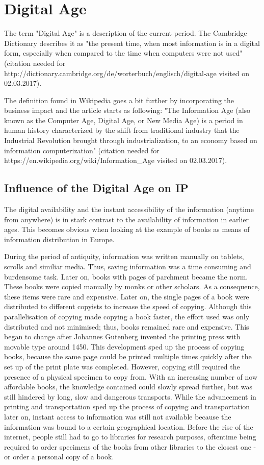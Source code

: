 \documentclass[a4paper]{report}
\begin{document}
\section{Digital Age}
\label{sec:Digital age}
The term "Digital Age" is a description of the current period. The Cambridge Dictionary describes it as "the present time, when most information is in a digital form, especially when compared to the time when computers were not used" (citation needed for http://dictionary.cambridge.org/de/worterbuch/englisch/digital-age visited on 02.03.2017).
 
The definition found in Wikipedia goes a bit further by incorporating the business impact and the article starts as following: "The Information Age (also known as the Computer Age, Digital Age, or New Media Age) is a period in human history characterized by the shift from traditional industry that the Industrial Revolution brought through industrialization, to an economy based on information computerization" (citation needed for https://en.wikipedia.org/wiki/Information\_Age visited on 02.03.2017).
   
\subsection{Influence of the Digital Age on IP}
The digital availability and the instant accessibility of the information (anytime from anywhere) is in stark contrast to the availability of information in earlier ages. This becomes obvious when looking at the example of books as means of information distribution in Europe.

During the period of antiquity, information was written manually on tablets, scrolls and similiar media. Thus, saving information was a time consuming and burdensome task.  Later on, books with pages of parchment became the norm. These books were copied manually by monks or other scholars. As a consequence, these items were rare and expensive. Later on, the single pages of a book were distributed to different copyists to increase the speed of copying. Although this parallelisation of copying made copying a book faster, the effort used was only distributed and not minimised; thus, books remained rare and expensive. This began to change after Johannes Gutenberg invented the printing press with movable type around 1450. This development sped up the process of copying books, because the same page could be printed multiple times quickly after the set up of the print plate was completed. However, copying still required the presence of a physical specimen to copy from. With an increasing number of now affordable books, the knowledge contained could slowly spread further, but was still hindered by long, slow and dangerous transports. While the advancement in printing and transportation sped up the process of copying and transportation later on, instant access to information was still not available because the information was bound to a certain geographical location. Before the rise of the internet, people still had to go to libraries for research purposes, oftentime being required to order specimens of the books from other libraries to the closest one - or order a personal copy of a book.
\end{document}
